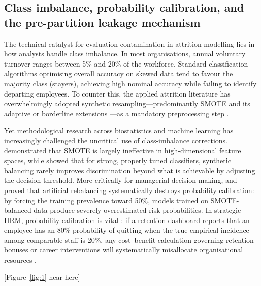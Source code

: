 \documentclass[12pt,a4paper]{article}
\begin{document}
\subsection{Class imbalance, probability calibration, and the pre-partition leakage mechanism}
\label{sec:imbalance}
The technical catalyst for evaluation contamination in attrition modelling lies in how analysts handle class imbalance. In most organisations, annual voluntary turnover ranges between 5\% and 20\% of the workforce. Standard classification algorithms optimising overall accuracy on skewed data tend to favour the majority class (stayers), achieving high nominal accuracy while failing to identify departing employees. To counter this, the applied attrition literature has overwhelmingly adopted synthetic resampling---predominantly SMOTE \parencite{ref5,ref27} and its adaptive or borderline extensions \parencite{ref6,ref7}---as a mandatory preprocessing step \parencite{ref23,ref24,ref29,ref26}.

Yet methodological research across biostatistics and machine learning has increasingly challenged the uncritical use of class-imbalance corrections. \textcite{ref8} demonstrated that SMOTE is largely ineffective in high-dimensional feature spaces, while \textcite{ref11} showed that for strong, properly tuned classifiers, synthetic balancing rarely improves discrimination beyond what is achievable by adjusting the decision threshold. More critically for managerial decision-making, \textcite{ref9} and \textcite{ref10} proved that artificial rebalancing systematically destroys probability calibration: by forcing the training prevalence toward 50\%, models trained on SMOTE-balanced data produce severely overestimated risk probabilities. In strategic HRM, probability calibration is vital \parencite{ref41,ref42,ref25}: if a retention dashboard reports that an employee has an 80\% probability of quitting when the true empirical incidence among comparable staff is 20\%, any cost--benefit calculation governing retention bonuses or career interventions will systematically misallocate organisational resources \parencite{ref20,ref34}.

\begin{center}
[Figure~\ref{fig:1} near here]
\end{center}
\end{document}
